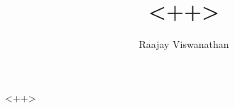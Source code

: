 \documentclass[a4paper,10pt]{article}
\title{<++>}
\author{Raajay Viswanathan}
\begin{document}
\maketitle
<++>
  
\end{document}
